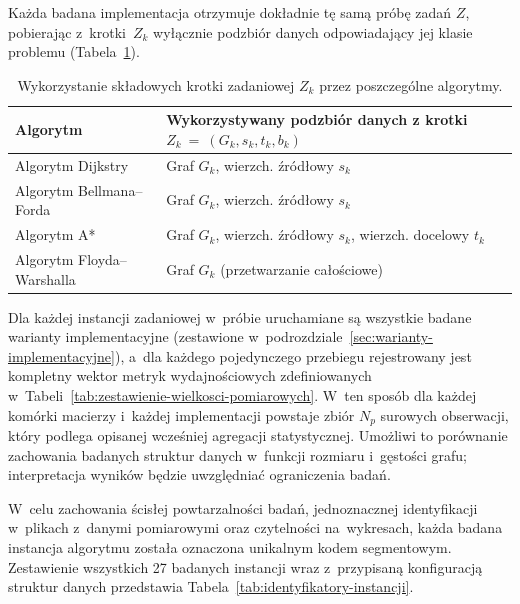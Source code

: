 \documentclass[11pt,a4paper,oneside]{report}
\begin{document}
Każda badana implementacja otrzymuje dokładnie tę samą próbę zadań $Z$, pobierając z~krotki~$Z_k$ wyłącznie podzbiór danych odpowiadający jej klasie problemu (Tabela~\ref{tab:wykorzystanie-danych-zadaniowych}).

\begin{table}[H]
  \centering
  \small
  \renewcommand{\arraystretch}{1.2}
  \begin{tabularx}{0.85\textwidth}{@{}l>{\raggedright\arraybackslash}X@{}}
    \toprule
    \textbf{Algorytm} & \textbf{Wykorzystywany podzbiór danych z krotki $Z_k~=~(G_k, s_k, t_k, b_k)$} \\
    \midrule
    Algorytm Dijkstry & Graf $G_k$, wierzch. źródłowy $s_k$ \\
    Algorytm Bellmana--Forda & Graf $G_k$, wierzch. źródłowy $s_k$ \\
    Algorytm A* & Graf $G_k$, wierzch. źródłowy $s_k$, wierzch. docelowy $t_k$ \\
    Algorytm Floyda--Warshalla & Graf $G_k$ (przetwarzanie całościowe) \\
    \bottomrule
  \end{tabularx}
  \caption{Wykorzystanie składowych krotki zadaniowej $Z_k$ przez poszczególne algorytmy.}
  \label{tab:wykorzystanie-danych-zadaniowych}
\end{table}

Dla każdej instancji zadaniowej w~próbie uruchamiane są wszystkie badane warianty implementacyjne (zestawione w~podrozdziale~\ref{sec:warianty-implementacyjne}), a~dla każdego pojedynczego przebiegu rejestrowany jest kompletny wektor metryk wydajnościowych zdefiniowanych w~Tabeli~\ref{tab:zestawienie-wielkosci-pomiarowych}. W~ten sposób dla każdej komórki macierzy i~każdej implementacji powstaje zbiór $N_p$ surowych obserwacji, który podlega opisanej wcześniej agregacji statystycznej. Umożliwi to porównanie zachowania badanych struktur danych w~funkcji rozmiaru i~gęstości grafu; interpretacja wyników będzie uwzględniać ograniczenia badań.

\newpage

W~celu zachowania ścisłej powtarzalności badań, jednoznacznej identyfikacji w~plikach z~danymi pomiarowymi oraz czytelności na~wykresach, każda badana instancja algorytmu została oznaczona unikalnym kodem segmentowym. Zestawienie wszystkich 27 badanych instancji wraz z~przypisaną konfiguracją struktur danych przedstawia Tabela~\ref{tab:identyfikatory-instancji}.
\end{document}

